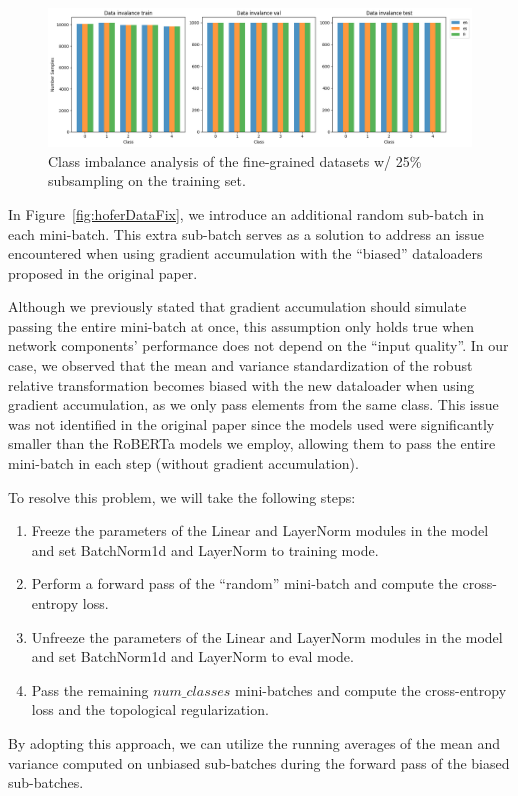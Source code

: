 \documentclass[../main.tex]{subfiles}
\begin{document}
\begin{figure}[!ht]
    \centering
    \includegraphics[width=\textwidth]{figures/mt/class_invalance.png} 
    \caption{Class imbalance analysis of the fine-grained datasets w/ 25\% subsampling on the training set.}
    \label{fig:clsImb}
\end{figure}


In Figure~\ref{fig:hoferDataFix}, we introduce an additional random sub-batch in each mini-batch. This extra sub-batch serves as a solution to address an issue encountered when using gradient accumulation with the ``biased'' dataloaders proposed in the original paper. 

Although we previously stated that gradient accumulation should simulate passing the entire mini-batch at once, this assumption only holds true when network components' performance does not depend on the ``input quality''. In our case, we observed that the mean and variance standardization of the robust relative transformation becomes biased with the new dataloader when using gradient accumulation, as we only pass elements from the same class. This issue was not identified in the original paper since the models used were significantly smaller than the RoBERTa models we employ, allowing them to pass the entire mini-batch in each step (without gradient accumulation).

To resolve this problem, we will take the following steps:
\begin{enumerate}
    \item Freeze the parameters of the Linear and LayerNorm modules in the model and set BatchNorm1d and LayerNorm to training mode.
    
    \item Perform a forward pass of the ``random'' mini-batch and compute the cross-entropy loss.
    
    \item Unfreeze the parameters of the Linear and LayerNorm modules in the model and set BatchNorm1d and LayerNorm to eval mode.
    
    \item Pass the remaining $num\_classes$ mini-batches and compute the cross-entropy loss and the topological regularization.

\end{enumerate}
By adopting this approach, we can utilize the running averages of the mean and variance computed on unbiased sub-batches during the forward pass of the biased sub-batches.\\
\end{document}
